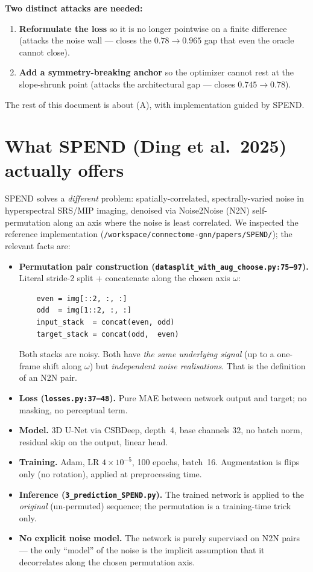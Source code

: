 \documentclass[11pt]{article}
\begin{document}
\medskip
\noindent\textbf{Two distinct attacks are needed:}
\begin{enumerate}[label=(\Alph*),leftmargin=*]
  \item \textbf{Reformulate the loss} so it is no longer pointwise on a
    finite difference (attacks the noise wall --- closes the
    $0.78 \rightarrow 0.965$ gap that even the oracle cannot close).
  \item \textbf{Add a symmetry-breaking anchor} so the optimizer cannot rest
    at the slope-shrunk point (attacks the architectural gap ---
    closes $0.745 \rightarrow 0.78$).
\end{enumerate}
The rest of this document is about (A), with implementation guided by SPEND.

\section{What SPEND (Ding et al.\ 2025) actually offers}

SPEND solves a \emph{different} problem: spatially-correlated,
spectrally-varied noise in hyperspectral SRS/MIP imaging, denoised via
Noise2Noise (N2N) self-permutation along an axis where the noise is least
correlated. We inspected the reference implementation
(\texttt{/workspace/connectome-gnn/papers/SPEND/}); the relevant facts are:

\begin{itemize}[leftmargin=*]
  \item \textbf{Permutation pair construction
    (\texttt{datasplit\_with\_aug\_choose.py:75--97}).}
    Literal stride-2 split + concatenate along the chosen axis $\omega$:
\begin{verbatim}
    even = img[::2, :, :]
    odd  = img[1::2, :, :]
    input_stack  = concat(even, odd)
    target_stack = concat(odd,  even)
\end{verbatim}
    Both stacks are noisy. Both have \emph{the same underlying signal} (up
    to a one-frame shift along $\omega$) but \emph{independent noise
    realisations}. That is the definition of an N2N pair.
  \item \textbf{Loss (\texttt{losses.py:37--48}).}
    Pure MAE between network output and target; no masking, no perceptual
    term.
  \item \textbf{Model.} 3D U-Net via CSBDeep, depth~4, base channels 32, no
    batch norm, residual skip on the output, linear head.
  \item \textbf{Training.} Adam, LR $4\times10^{-5}$, 100 epochs, batch~16.
    Augmentation is flips only (no rotation), applied at preprocessing time.
  \item \textbf{Inference (\texttt{3\_prediction\_SPEND.py}).} The trained
    network is applied to the \emph{original} (un-permuted) sequence; the
    permutation is a training-time trick only.
  \item \textbf{No explicit noise model.} The network is purely supervised
    on N2N pairs --- the only ``model'' of the noise is the implicit
    assumption that it decorrelates along the chosen permutation axis.
\end{itemize}
\end{document}
